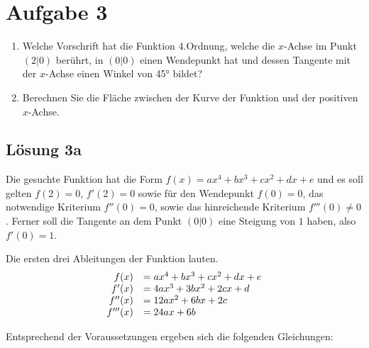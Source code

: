 \documentclass[main.tex]{subfiles}
\begin{document}
\section{Aufgabe 3}

\begin{enumerate}
    \item Welche Vorschrift hat die Funktion 4.Ordnung, welche die $x$-Achse im Punkt $( 2|0)$ berührt, in $( 0|0)$ einen Wendepunkt hat und dessen Tangente mit der $x$-Achse einen Winkel von 45° bildet?
    \item Berechnen Sie die Fläche zwischen der Kurve der Funktion und der positiven $x$-Achse.
\end{enumerate}

\subsection{Lösung 3a}

Die gesuchte Funktion hat die Form $f( x) =ax^{4} +bx^{3} +cx^{2} +dx+e$ und es soll gelten $f( 2) =0$, $f'( 2) =0$ sowie für den Wendepunkt $f( 0) =0$, das notwendige Kriterium $f''( 0) =0$, sowie das hinreichende Kriterium $f'''( 0) \neq 0$. Ferner soll die Tangente an dem Punkt $( 0|0)$ eine Steigung von $1$ haben, also $f'( 0) =1$.

Die ersten drei Ableitungen der Funktion lauten.
\begin{equation*}
    \begin{array}{ r l }
    f( x) & =ax^{4} +bx^{3} +cx^{2} +dx+e\\
    f'( x) & =4ax^{3} +3bx^{2} +2cx+d\\
    f''( x) & =12ax^{2} +6bx+2c\\
    f'''( x) & =24ax+6b
    \end{array}
\end{equation*}

Entsprechend der Voraussetzungen ergeben sich die folgenden Gleichungen:
\arraycolsep=1.2pt\def\arraystretch{1.2} %
\end{document}
